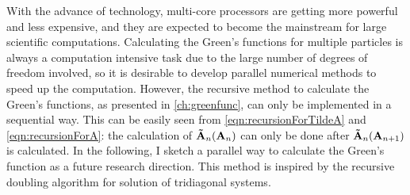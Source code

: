 With the advance of technology, multi-core processors are getting more powerful and less expensive, and they are 
expected 
to become the mainstream for large scientific computations. Calculating the Green's functions for multiple particles is 
always a computation intensive task due to the large number of degrees of freedom involved, so it is desirable to 
develop parallel numerical methods to speed up the computation. 
However, the recursive method to calculate the Green's 
functions, as presented in \autoref{ch:greenfunc}, can only be implemented in a sequential way.  This can be easily 
seen from \autoref{eqn:recursionForTildeA} and \autoref{eqn:recursionForA}: the calculation of  
$\mathbf{\Tilde{A}}_{n} (\mathbf{A}_n)$ can only be done after $\mathbf{\Tilde{A}}_{n} (\mathbf{A}_{n+1})$ is 
calculated.  In the following, I sketch a parallel way to calculate the Green's function as a future research 
direction. This method is inspired by the recursive doubling algorithm for solution of tridiagonal 
systems\cite{egecioglu1989}. 


